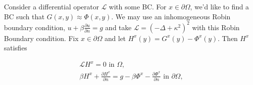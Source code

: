 \documentclass[paper=a4, fontsize=11pt]{scrartcl} %
\numberwithin{equation}{section} %
\numberwithin{figure}{section} %
\numberwithin{table}{section} %
\newcommand{\Op}{\mathcal{L}}
\begin{document}




Consider a differential operator $\Op$ with some BC. For $x\in \partial \Omega$, we'd like to find a BC 
such that $G(x,y) \approx \Phi(x,y)$. We may use an inhomogeneous Robin boundary condition,
$u + \beta \frac{\partial u}{\partial n} = g$ and take $\Op = (-\Delta + \kappa^2)^2$ with this Robin 
Boundary condition. Fix $x \in \partial \Omega$ and let $H^x(y) = G^{x}(y) - \Phi^{x}(y)$. Then $H^{x}$ satisfies

\begin{align*}
  &\Op H^{x} = 0 \text{ in } \Omega, \\
  &\beta H^{x} + \frac{\partial H^{x}}{\partial n} = g - \beta\Phi^{x}  - \frac{\partial \Phi^{x}}{\partial n}  \text{ in } \partial \Omega, 
\end{align*}
\end{document}
